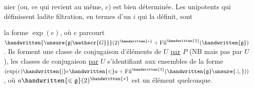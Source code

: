 nier (ou, ce qui revient au même, $c$) est bien déterminée. Les unipotents qui définissent ladite filtration, en termes d'un $i$ qui la définit, sont
la forme $\exp(e)$, où $e$ parcourt $\handwritten{\unsure{\mathfrak{g}|\mathscr{G}}}(2)^{\handwritten{*}}+\operatorname{Fil}^{\handwritten{3}}(\handwritten{\mathfrak{g}})$. Ils forment une classe de conjugaison d'éléments de $U$ \uline{par} $P$ (NB mais pas par $U$), les classes de conjugaison \uline{par} $U$ s'identifiant aux ensembles de la forme $(\exp(e)\handwritten{\mid}e\handwritten{\in}a+\operatorname{Fil}^{\handwritten{3}}(\handwritten{\mathfrak{g}}\unsure{.|,}))$, où $a\handwritten{\in\mathfrak{g}}(2)^{\handwritten{*}}$ est un élément quelconque.

